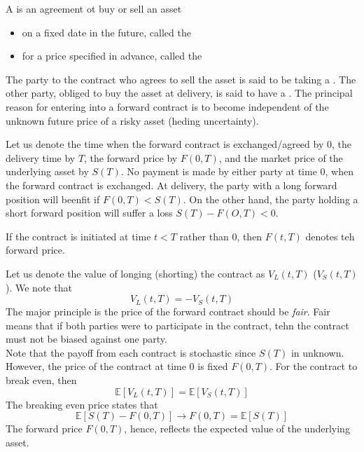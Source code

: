 \documentclass{article}
\begin{document}
A  is an agreement ot buy or sell an asset 
\begin{itemize}
  \item on a fixed date in the future, called the 
  \item for a price specified in advance, called the 
\end{itemize}
The party to the contract who agrees to sell the asset is said to be taking a . The other party, obliged to buy the asset at delivery, is said to have a . The principal reason for entering into a forward contract is to become independent of the unknown future price of a risky asset (heding uncertainty). \\ 

\begin{remark}
  Let us denote the time when the forward contract is exchanged/agreed by $0$, the delivery time by $T$, the forward price by $F(0,T)$, and the market price of the underlying asset by $S(T)$. No payment is made by either party at time 0, when the forward contract is exchanged. At delivery, the party with a long forward position will beenfit if $F(0,T) < S(T)$. On the other hand, the party holding a short forward position will suffer a loss $S(T) - F(O,T) < 0$. 
\end{remark}

\begin{remark}
  If the contract is initiated at time $t< T$ rather than $0$, then $F(t,T)$ denotes teh forward price. 
\end{remark}

Let us denote the value of longing (shorting) the contract as $V_L (t,T)$ ($V_S (t,T)$). We note that $$V_L (t,T) = -V_S (t,T)$$ The major principle is the price of the forward contract should be \emph{fair}. Fair means that if both parties were to participate in the contract, tehn the contract must not be biased against one party. \\ 

Note that the payoff from each contract is stochastic since $S(T)$ in unknown. However, the price of the contract at time $0$ is fixed $F(0,T)$. For the contract to break even, then $$\mathbb{E}[V_L(t,T)] = \mathbb{E}[V_S (t,T)]$$ The breaking even price states that $$\mathbb{E}[S(T) - F(0,T)] \rightarrow F(0,T) = \mathbb{E}[S(T)]$$ The forward price $F(0,T)$, hence, reflects the expected value of the underlying asset. \\ 
\end{document}
